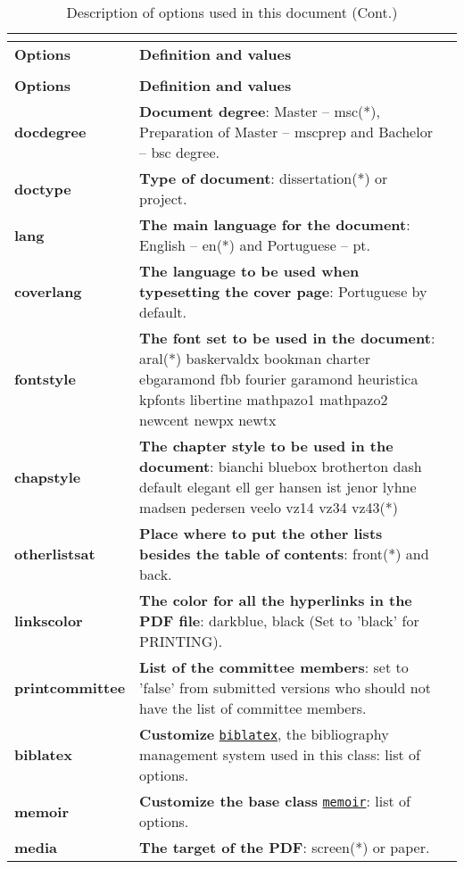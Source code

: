 \begin{xltabular}{\linewidth}{ >{\bfseries}l   X }
\caption{Description of options used in this document}
\label{tab:vardescription}                                  
\addtocounter{table}{-1}                  \\
    \toprule
\textbf{Options} & \textbf{Definition and values}  \\
    \midrule
\endfirsthead
\caption[]{Description of options used in this document (Cont.)} \\
    \toprule
\textbf{Options} & \textbf{Definition and values}      \\
    \midrule
\endhead
\endfoot
    \bottomrule
\endlastfoot
docdegree   &  \textbf{Document degree}: Master -- msc(*), Preparation of Master -- mscprep and Bachelor -- bsc degree. \\ \midrule
doctype & \textbf{Type of document}: dissertation(*) or project. \\ \midrule
lang    &  \textbf{The main language for the document}: English -- en(*) and Portuguese -- pt.  \\  \midrule
coverlang   &  \textbf{The language to be used when typesetting the cover page}: Portuguese by default.  \\  \midrule
fontstyle & \textbf{The font set to be used in the document}: aral(*) baskervaldx bookman charter ebgaramond fbb fourier garamond heuristica kpfonts libertine mathpazo1 mathpazo2 newcent newpx newtx  \\  \midrule
chapstyle   & \textbf{The chapter style to be used in the document}: bianchi bluebox brotherton dash default elegant ell ger hansen ist jenor lyhne madsen pedersen veelo vz14 vz34 vz43(*) \\  \midrule
otherlistsat &   \textbf{Place where to put the other lists besides the table of contents}: front(*) and back. \\  \midrule
linkscolor & \textbf{The color for all the hyperlinks in the PDF file}: darkblue, black (Set to 'black' for PRINTING). \\ \midrule
printcommittee &  \textbf{List of the committee members}: set to 'false' from submitted versions who should not have the list of committee members.   \\ \midrule
biblatex  & \textbf{Customize} \href{https://ctan.org/pkg/biblatex?lang=en}{\texttt{biblatex}}, the bibliography management system used in this class: list of options.  \\ \midrule
memoir  & \textbf{Customize the base class} \href{https://ctan.math.illinois.edu/macros/latex/contrib/memoir/memman.pdf}{\texttt{memoir}}: list of options.  \\ \midrule
media  & \textbf{The target of the PDF}: screen(*) or paper.\\
\bottomrule
\end{xltabular}


